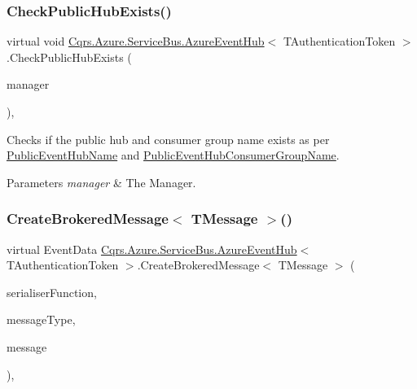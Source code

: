 \subsubsection{\texorpdfstring{Check\+Public\+Hub\+Exists()}{CheckPublicHubExists()}}
{\footnotesize\ttfamily virtual void \hyperlink{classCqrs_1_1Azure_1_1ServiceBus_1_1AzureEventHub}{Cqrs.\+Azure.\+Service\+Bus.\+Azure\+Event\+Hub}$<$ T\+Authentication\+Token $>$.Check\+Public\+Hub\+Exists (\begin{DoxyParamCaption}\item[{Manager}]{manager }\end{DoxyParamCaption})\hspace{0.3cm}{\ttfamily [protected]}, {\ttfamily [virtual]}}



Checks if the public hub and consumer group name exists as per \hyperlink{classCqrs_1_1Azure_1_1ServiceBus_1_1AzureEventHub_a6012f2290f9397929e9d6d5419963482_a6012f2290f9397929e9d6d5419963482}{Public\+Event\+Hub\+Name} and \hyperlink{classCqrs_1_1Azure_1_1ServiceBus_1_1AzureEventHub_a505c495eb73e4f888431d408e0b0d8ab_a505c495eb73e4f888431d408e0b0d8ab}{Public\+Event\+Hub\+Consumer\+Group\+Name}. 


\begin{DoxyParams}{Parameters}
{\em manager} & The Manager.\\
\hline
\end{DoxyParams}
\mbox{\label{classCqrs_1_1Azure_1_1ServiceBus_1_1AzureEventHub_a8302c7e2f88a666862b3d9fd4531b1f2_a8302c7e2f88a666862b3d9fd4531b1f2}} 
\subsubsection{\texorpdfstring{Create\+Brokered\+Message$<$ T\+Message $>$()}{CreateBrokeredMessage< TMessage >()}}
{\footnotesize\ttfamily virtual Event\+Data \hyperlink{classCqrs_1_1Azure_1_1ServiceBus_1_1AzureEventHub}{Cqrs.\+Azure.\+Service\+Bus.\+Azure\+Event\+Hub}$<$ T\+Authentication\+Token $>$.Create\+Brokered\+Message$<$ T\+Message $>$ (\begin{DoxyParamCaption}\item[{Func$<$ T\+Message, string $>$}]{serialiser\+Function,  }\item[{Type}]{message\+Type,  }\item[{T\+Message}]{message }\end{DoxyParamCaption})\hspace{0.3cm}{\ttfamily [protected]}, {\ttfamily [virtual]}}




